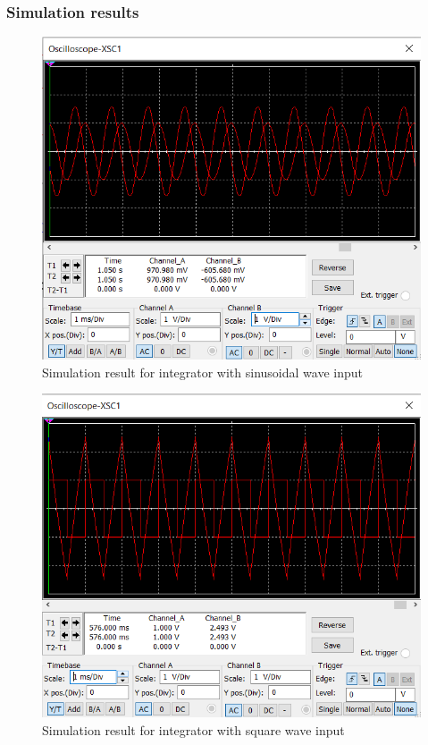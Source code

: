 \documentclass[a4paper, 12pt, english]{article}
\newlength{\simheight}
\begin{document}
\subsubsection{Simulation results}
\begin{figure}[H]
    \centering
    \includegraphics[width=\linewidth, height=0.8\simheight]{images/intg sine.png}
    \caption{Simulation result for integrator with sinusoidal wave input}
    \label{fig:Simulation result for integrator with sinusoidal wave input}
\end{figure}
\begin{figure}[H]
    \centering
    \includegraphics[width=\linewidth, height=0.8\simheight]{images/intg square.png}
    \caption{Simulation result for integrator with square wave input}
    \label{fig:Simulation result for integrator with square wave input}
\end{figure}
\end{document}
